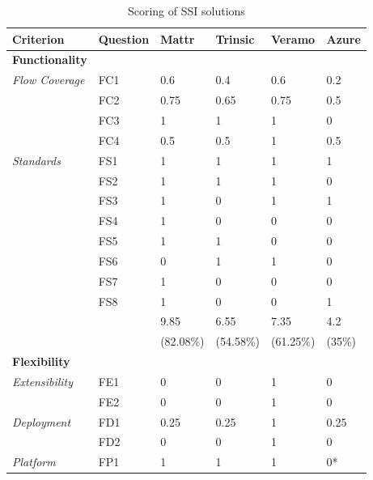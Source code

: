     \setlength\LTleft{0pt}
    \setlength\LTright{0pt}
    \begin{longtable}{@{\extracolsep{\fill}}llllll@{}}
        \caption{Scoring of \ac{SSI} solutions}
        \label{tab: scores}\\
        \toprule
        \textbf{Criterion}     & \textbf{Question} & \textbf{Mattr} & \textbf{Trinsic} & \textbf{Veramo} & \textbf{Azure} \\ \midrule
        \endfirsthead\endhead\endfoot\endlastfoot
        \textbf{Functionality} &&&&&\\
        \textit{Flow Coverage} & FC1 & 0.6 & 0.4 & 0.6 & 0.2 \\
                               & FC2 & 0.75 & 0.65 & 0.75 & 0.5 \\
                               & FC3 & 1 & 1 & 1 & 0 \\
                               & FC4 & 0.5 & 0.5 & 1 & 0.5 \\
        \textit{Standards}     & FS1 & 1 & 1 & 1 & 1 \\
                               & FS2 & 1 & 1 & 1 & 0 \\
                               & FS3 & 1 & 0 & 1 & 1 \\
                               & FS4 & 1 & 0 & 0 & 0 \\
                               & FS5 & 1 & 1 & 0 & 0 \\
                               & FS6 & 0 & 1 & 1 & 0 \\
                               & FS7 & 1 & 0 & 0 & 0 \\
                               & FS8 & 1 & 0 & 0 & 1 \\
                               \hline
                               && 9.85 & 6.55 & 7.35 & 4.2\\
                               && (82.08\%) & (54.58\%) & (61.25\%) & (35\%) \\                               
                               \midrule
        \textbf{Flexibility} &&&&&\\
        \textit{Extensibility} & FE1 & 0 & 0 & 1 & 0 \\
                               & FE2 & 0 & 0 & 1 & 0 \\
        \textit{Deployment}    & FD1 & 0.25 & 0.25 & 1 & 0.25 \\
                               & FD2 & 0 & 0 & 1 & 0 \\
        \textit{Platform}      & FP1 & 1 & 1 & 1 & 0* \\

\end{longtable}
